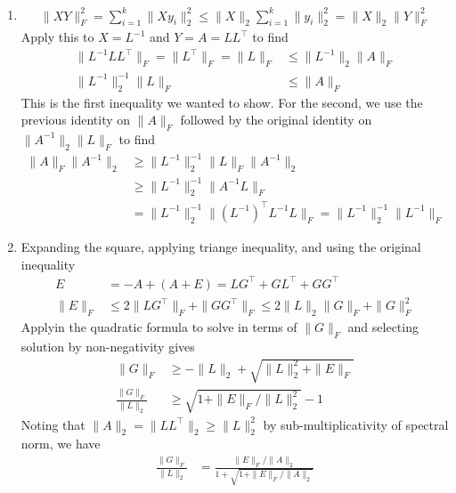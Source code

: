 \documentclass[12pt,letterpaper,boxed]{hmcpset}
\begin{document}
\begin{problem}

\end{problem}

\begin{solution}
  \begin{enumerate}
    \item
      \begin{align}
	\|X Y\|_F^2
	= \sum_{i=1}^k \| X y_i \|_2^2
	\leq \|X\|_2 \sum_{i=1}^k \|y_i\|_2^2
	= \|X\|_2 \|Y\|_F^2
      \end{align}
      Apply this to $X = L^{-1}$ and $Y = A = L L^\top$ to find
      \begin{align}
	\| L^{-1} L L^\top \|_F
	= \| L^\top \|_F
	= \| L \|_F
	&\leq \| L^{-1}\|_2 \|A\|_F \\
	\|L^{-1}\|_2^{-1} \|L\|_F
	&\leq \|A\|_F
      \end{align}
      This is the first inequality we wanted to show.
      For the second, we use the previous identity on $\|A\|_F$
      followed by the original identity on $\|A^{-1}\|_2 \|L\|_F$
      to find
      \begin{align}
	\|A\|_F \|A^{-1}\|_2
	&\geq \|L^{-1}\|_2^{-1} \|L\|_F \|A^{-1}\|_2  \\
	&\geq \|L^{-1}\|_2^{-1} \|A^{-1} L\|_F \\
	&= \|L^{-1}\|_2^{-1} \|(L^{-1})^\top L^{-1} L\|_F
	= \|L^{-1}\|_2^{-1} \|L^{-1}\|_F
      \end{align}

    \item
      Expanding the square, applying triange inequality, and using the original
      inequality
      \begin{align}
	E
	&= -A + (A + E)
	= L G^\top + G L^\top + G G^\top \\
	\|E\|_F &\leq 2 \|L G^\top\|_F + \|G G^\top\|_F
		\leq 2 \|L\|_2 \|G\|_F + \|G\|_F^2
      \end{align}
      Applyin the quadratic formula to solve in terms of $\|G\|_F$
      and selecting solution by non-negativity gives
      \begin{align}
	\|G\|_F &\geq -\|L\|_2 + \sqrt{\|L\|_2^2 + \|E\|_F} \\
	\frac{\|G\|_F}{\|L\|_2} &\geq \sqrt{1 + \|E\|_F / \|L\|^2_2}  - 1
      \end{align}
      Noting that $\|A\|_2 = \|L L^\top\|_2 \geq \|L\|_2^2$ by
      sub-multiplicativity of spectral norm, we have
      \begin{align}
	\frac{\|G\|_F}{\|L\|_2}
	&= \frac{\|E\|_F / \|A\|_2}{1 + \sqrt{1 + \|E\|_F / \|A\|_2}}
      \end{align}


\end{enumerate}
\end{solution}
\end{document}
